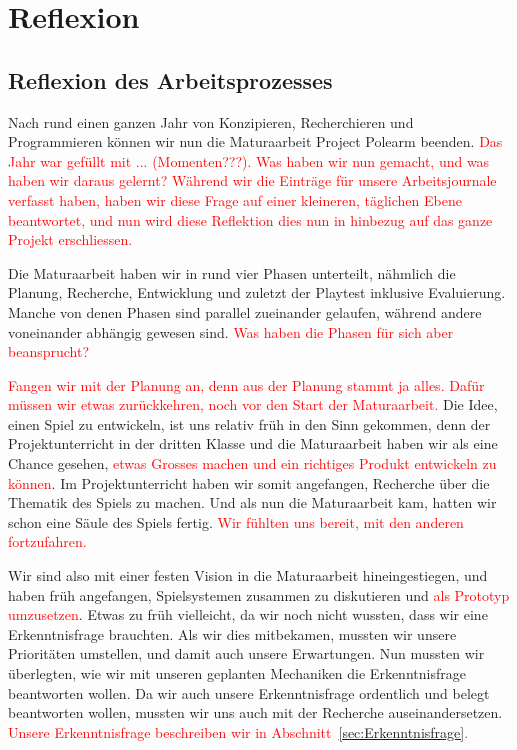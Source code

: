 \documentclass[../Main.tex]{subfiles}
\begin{document}
\section{Reflexion} \label{sec:Reflexion}

\subsection{Reflexion des Arbeitsprozesses}

Nach rund einen ganzen Jahr von Konzipieren, Recherchieren und Programmieren können wir nun die Maturaarbeit Project Polearm beenden. \textcolor{red}{Das Jahr war gefüllt mit ... (Momenten???). Was haben wir nun gemacht, und was haben wir daraus gelernt? Während wir die Einträge für unsere Arbeitsjournale verfasst haben, haben wir diese Frage auf einer kleineren, täglichen Ebene beantwortet, und nun wird diese Reflektion dies nun in hinbezug auf das ganze Projekt erschliessen.}

Die Maturaarbeit haben wir in rund vier Phasen unterteilt, nähmlich die Planung, Recherche, Entwicklung und zuletzt der Playtest inklusive Evaluierung. Manche von denen Phasen sind parallel zueinander gelaufen, während andere voneinander abhängig gewesen sind. \textcolor{red}{Was haben die Phasen für sich aber beansprucht?}

\textcolor{red}{Fangen wir mit der Planung an, denn aus der Planung stammt ja alles. Dafür müssen wir etwas zurückkehren, noch vor den Start der Maturaarbeit.} Die Idee, einen Spiel zu entwickeln, ist uns relativ früh in den Sinn gekommen, denn der Projektunterricht in der dritten Klasse und die Maturaarbeit haben wir als eine Chance gesehen, \textcolor{red}{etwas Grosses machen und ein richtiges Produkt entwickeln zu können}. Im Projektunterricht haben wir somit angefangen, Recherche über die Thematik des Spiels zu machen. Und als nun die Maturaarbeit kam, hatten wir schon eine Säule des Spiels fertig. \textcolor{red}{Wir fühlten uns bereit, mit den anderen fortzufahren.}

Wir sind also mit einer festen Vision in die Maturaarbeit hineingestiegen, und haben früh angefangen, Spielsystemen zusammen zu diskutieren und \textcolor{red}{als Prototyp umzusetzen}. Etwas zu früh vielleicht, da wir noch nicht wussten, dass wir eine Erkenntnisfrage brauchten. Als wir dies mitbekamen, mussten wir unsere Prioritäten umstellen, und damit auch unsere Erwartungen. Nun mussten wir überlegten, wie wir mit unseren geplanten Mechaniken die Erkenntnisfrage beantworten wollen.  Da wir auch unsere Erkenntnisfrage ordentlich und belegt beantworten wollen, mussten wir uns auch mit der Recherche auseinandersetzen.\textcolor{red}{ Unsere Erkenntnisfrage beschreiben wir in Abschnitt~\ref{sec:Erkenntnisfrage}.}
\end{document}
